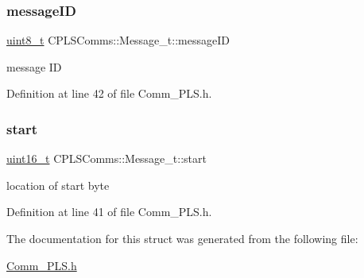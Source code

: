 \subsubsection{\texorpdfstring{messageID}{messageID}}
{\footnotesize\ttfamily \mbox{\hyperlink{_a_d_a_s___types_8h_aba7bc1797add20fe3efdf37ced1182c5}{uint8\+\_\+t}} C\+P\+L\+S\+Comms\+::\+Message\+\_\+t\+::message\+ID}

message ID 

Definition at line 42 of file Comm\+\_\+\+P\+L\+S.\+h.

\mbox{\label{struct_c_p_l_s_comms_1_1_message__t_a760e6f39adfed2b0440477560654f02f}} 
\subsubsection{\texorpdfstring{start}{start}}
{\footnotesize\ttfamily \mbox{\hyperlink{_a_d_a_s___types_8h_a1f1825b69244eb3ad2c7165ddc99c956}{uint16\+\_\+t}} C\+P\+L\+S\+Comms\+::\+Message\+\_\+t\+::start}

location of start byte 

Definition at line 41 of file Comm\+\_\+\+P\+L\+S.\+h.



The documentation for this struct was generated from the following file\+:\begin{DoxyCompactItemize}
\item 
\mbox{\hyperlink{_comm___p_l_s_8h}{Comm\+\_\+\+P\+L\+S.\+h}}\end{DoxyCompactItemize}
